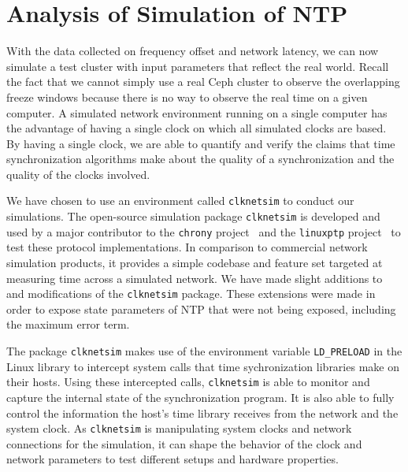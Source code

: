         



\section{Analysis of Simulation of NTP}

With the data collected on frequency offset and network latency, we
can now simulate a test cluster with input parameters that reflect the
real world. Recall the fact that we cannot simply use a real Ceph
cluster to observe the overlapping freeze windows because there is no
way to observe the real time on a given computer. A simulated network
environment running on a single computer has the advantage of having a
single clock on which all simulated clocks are based. By having a
single clock, we are able to quantify and verify the claims that time
synchronization algorithms make about the quality of a synchronization
and the quality of the clocks involved.

We have chosen to use an environment called
\texttt{clknetsim} %
to conduct our simulations. The open-source simulation package
\texttt{clknetsim} is developed and used by a major contributor to the
\texttt{chrony} project~\citep{chrony} and the \texttt{linuxptp}
project~\citep{linuxptp} to test these protocol implementations. In
comparison to commercial network simulation products, it provides a
simple codebase and feature set targeted at measuring time across a
simulated network. We have made slight additions to and modifications
of the \texttt{clknetsim} package. These extensions were made in order
to expose state parameters of NTP that were not being exposed,
including the maximum error term.

The package \texttt{clknetsim} makes use of the environment variable
\texttt{LD\_PRELOAD} in the Linux library to intercept system calls
that time sychronization libraries make on their hosts. Using these
intercepted calls, \texttt{clknetsim} is able to monitor and capture
the internal state of the synchronization program. It is also able to
fully control the information the host's time library receives from
the network and the system clock. As \texttt{clknetsim} is
manipulating system clocks and network connections for the simulation,
it can shape the behavior of the clock and network parameters to test
different setups and hardware properties.

